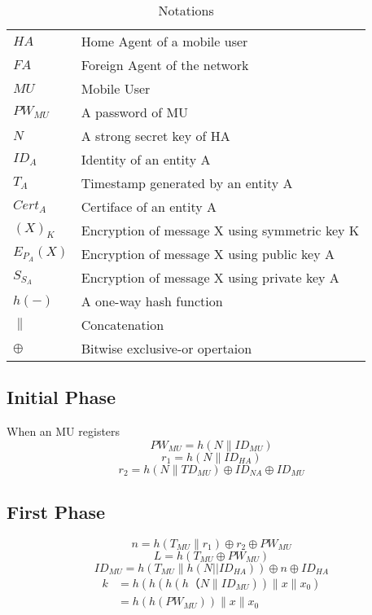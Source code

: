 \documentclass[UTF8]{ctexart}
\begin{document}
\begin{table}[!hbp]
\caption{Notations}
\centering
\begin{tabular}{|l|l|}
  \hline
  $ HA $& Home Agent of a mobile user \\
  $ FA $& Foreign Agent of the network \\
  $ MU $& Mobile User \\
  $ PW_{MU} $& A password of MU \\
  $ N $& A strong secret key of HA \\
  $ ID_A $& Identity of an entity A \\
  $ T_A $& Timestamp generated by an entity A \\
  $ Cert_A $& Certiface of an entity A \\
  $ (X)_{K} $& Encryption of message X using symmetric key K \\
  $ E_{P_{A}}(X) $& Encryption of message X using public key A \\
  $ S_{S_{A}} $&Encryption of message X using private key A  \\
  $ h(-) $& A one-way hash function \\
  $ \| $& Concatenation \\
  $ \oplus $& Bitwise exclusive-or opertaion\\
  \hline
\end{tabular}
\end{table}


\subsection{Initial Phase}
When an MU registers
\begin{equation}
PW_{MU}=h(N\|ID_{MU})
\end{equation}
\begin{equation}
r_1=h(N\|ID_{HA})
\end{equation}
\begin{equation}
r_2=h(N\|TD_{MU})\oplus{ID_{NA}}\oplus{ID_{MU}}
\end{equation}

\subsection{First Phase}
\begin{equation}
n=h(T_{MU}\|r_1)\oplus r_2\oplus PW_{MU}
\end{equation}
\begin{equation}
L=h(T_{MU}\oplus PW_{MU})
\end{equation}
\begin{equation}
ID_{MU}=h(T_{MU}\|h(N||ID_{HA}))\oplus n\oplus ID_{HA}
\end{equation}
\begin{equation}
\begin{aligned}
k&=h(h(h(h（N\|ID_{MU}))\|x\|x_0)\\
 &=h(h(PW_{MU}))\|x\|x_0
\end{aligned}
\end{equation}
\end{document}
